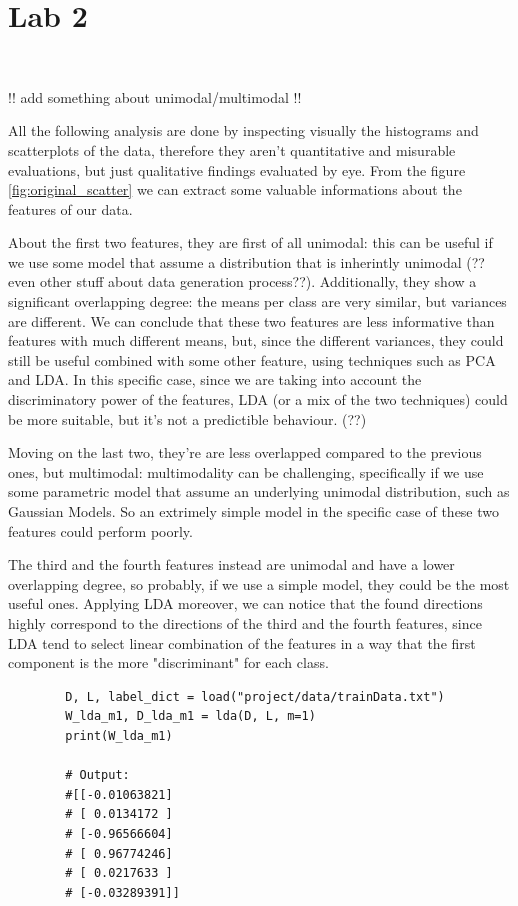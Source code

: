 
\section{Lab 2}
\

!! add something about unimodal/multimodal !!

All the following analysis are done by inspecting visually the
histograms and scatterplots of the data, therefore they aren't quantitative and misurable
evaluations, but just qualitative findings evaluated by eye.
From the figure \ref{fig:original_scatter} we can extract some valuable informations about the features
of our data.

About the first two features, they are first of all unimodal: this can be useful if we use some
model that assume a distribution that is inherintly unimodal (??even other stuff about data generation
process??).
Additionally, they show a significant overlapping degree: the means per class are very similar, but variances are different.
We can conclude that these two features are less informative than features with much different means,
but, since the different variances, they could still be useful combined with some other feature,
using techniques such as PCA and LDA. In this specific case, since we are taking
into account the discriminatory power of the features, LDA (or a mix of the two techniques)
could be more suitable, but it's not a predictible behaviour. (??)

Moving on the last two, they're are less overlapped compared to the previous ones, but multimodal: multimodality can be challenging,
specifically if we use some parametric model that assume an underlying unimodal distribution, such
as Gaussian Models. So an extrimely simple model in the specific case of these two features could perform poorly.

The third and the fourth features instead are unimodal and have a lower overlapping degree,
so probably, if we use a simple model, they could be the most useful ones. 
Applying LDA moreover, we can notice that the found directions highly correspond
to the directions of the third and the fourth features, since LDA
tend to select linear combination of the features in a way that the first component
is the more "discriminant" for each class.

\begin{center}
    \begin{lstlisting}
        D, L, label_dict = load("project/data/trainData.txt")
        W_lda_m1, D_lda_m1 = lda(D, L, m=1)
        print(W_lda_m1)
        
        # Output:
        #[[-0.01063821]
        # [ 0.0134172 ]
        # [-0.96566604]
        # [ 0.96774246]
        # [ 0.0217633 ]
        # [-0.03289391]]
        
    \end{lstlisting}
\end{center}
    
